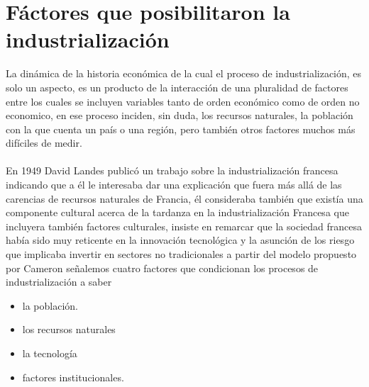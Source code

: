 \documentclass[12pt]{book}++
\begin{document}
\chapter{F\'actores que posibilitaron la industrializaci\'on}

La dinámica de la historia económica de la cual el proceso de industrialización, es solo un aspecto, es un producto de la interacción de una pluralidad de factores entre los cuales se incluyen variables tanto de orden económico como de orden no economico, en ese proceso inciden, sin duda, los recursos naturales, la población con la que cuenta un país o una región, pero también otros factores muchos más difíciles de medir.
\\
\\
En 1949 David Landes publicó un trabajo sobre la industrialización francesa indicando que a él le interesaba dar una explicación que fuera más allá de las carencias de recursos naturales de Francia, él consideraba también que existía una componente cultural acerca de la tardanza en la industrialización Francesa que incluyera también factores culturales, insiste en remarcar que la sociedad francesa había sido muy reticente en la innovación tecnológica y la asunción de los riesgo que implicaba invertir en sectores no tradicionales a partir del modelo propuesto por Cameron señalemos cuatro factores que condicionan los procesos de industrialización a saber 
\begin{itemize}
\item la población.
\item los recursos naturales 
\item la tecnología 
\item factores institucionales.
\end{itemize}
\end{document}
